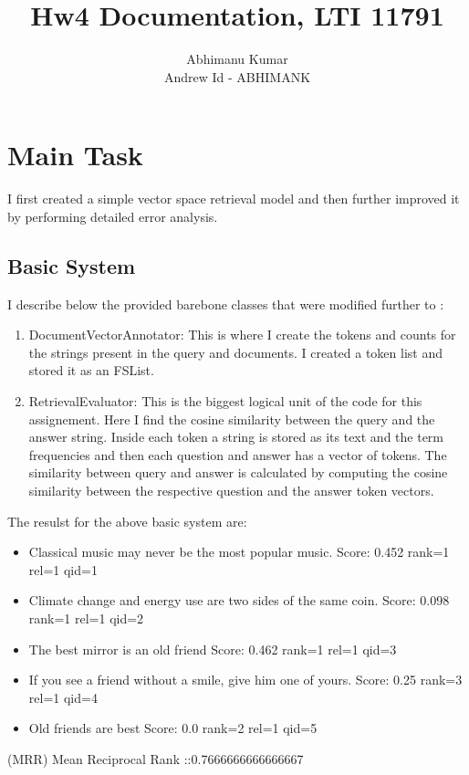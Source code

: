 \documentclass{article}
\title{Hw4 Documentation, LTI 11791}
\author{Abhimanu Kumar \\ Andrew Id - ABHIMANK}
\begin{document}
\maketitle

\section{Main Task }
I first created a simple vector space retrieval model and then further improved it by 
performing detailed error analysis.

\subsection{Basic System}
I describe below the provided barebone classes that were modified further to :
\begin{enumerate}
\item  DocumentVectorAnnotator: This is where I create the tokens and counts for the 
strings present in the query and documents. 
I created a token list and stored it as an FSList.

\item RetrievalEvaluator: This is the biggest logical unit of the code for this 
assignement. Here I find the cosine similarity between the query and the answer 
string. Inside each token a string is stored as its text and the term frequencies and 
then each question and answer has a vector of tokens.  The similarity between  
query and answer is calculated by computing the cosine similarity between the 
respective question and the answer token vectors.


\end{enumerate}

The resulst for the above basic system are:
\begin{itemize}
\item Classical music may never be the most popular music. Score: 0.452 rank=1 rel=1 qid=1
\item Climate change and energy use are two sides of the same coin. Score: 0.098 rank=1 rel=1 qid=2
\item The best mirror is an old friend Score: 0.462 rank=1 rel=1 qid=3
\item If you see a friend without a smile, give him one of yours. Score: 0.25 rank=3 rel=1 qid=4

\item Old friends are best  Score: 0.0 rank=2 rel=1 qid=5 

\end{itemize}
(MRR) Mean Reciprocal Rank ::0.7666666666666667
\end{document}
